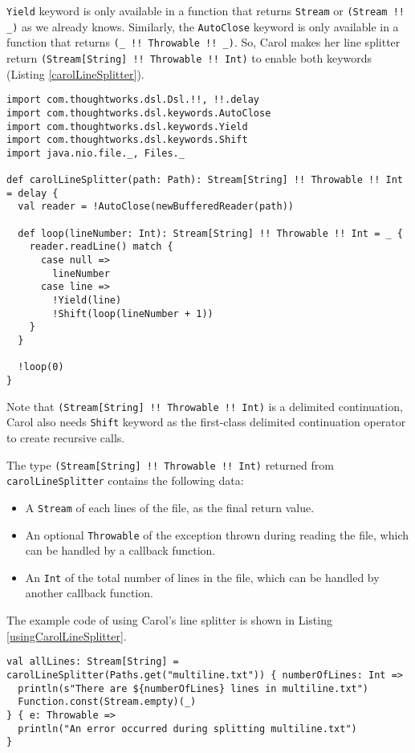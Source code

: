 \lstinline{Yield} keyword is only available in a function that returns \lstinline{Stream} or \lstinline{(Stream !! _)} as we already knows. Similarly, the \lstinline{AutoClose} keyword is only available in a function that returns \lstinline{(_ !! Throwable !! _)}. So, Carol makes her line splitter return \lstinline{(Stream[String] !! Throwable !! Int)} to enable both keywords (Listing \ref{carolLineSplitter}).

\begin{lstlisting}[caption={Carol's line splitter},label={carolLineSplitter}]
import com.thoughtworks.dsl.Dsl.!!, !!.delay
import com.thoughtworks.dsl.keywords.AutoClose
import com.thoughtworks.dsl.keywords.Yield
import com.thoughtworks.dsl.keywords.Shift
import java.nio.file._, Files._

def carolLineSplitter(path: Path): Stream[String] !! Throwable !! Int = delay {
  val reader = !AutoClose(newBufferedReader(path))

  def loop(lineNumber: Int): Stream[String] !! Throwable !! Int = _ {
    reader.readLine() match {
      case null =>
        lineNumber
      case line =>
        !Yield(line)
        !Shift(loop(lineNumber + 1))
    }
  }

  !loop(0)
}
\end{lstlisting}

Note that \lstinline{(Stream[String] !! Throwable !! Int)} is a delimited continuation, Carol also needs \lstinline{Shift} keyword as the first-class delimited continuation operator\cite{danvy1990abstracting,asai2009typing} to create recursive calls.

The type \lstinline{(Stream[String] !! Throwable !! Int)} returned from \lstinline{carolLineSplitter} contains the following data:

\begin{itemize}
  \item A \lstinline{Stream} of each lines of the file, as the final return value.
  \item An optional \lstinline{Throwable} of the exception thrown during reading the file, which can be handled by a callback function.
  \item An \lstinline{Int} of the total number of lines in the file, which can be handled by another callback function.
\end{itemize}

The example code of using Carol's line splitter is shown in Listing \ref{usingCarolLineSplitter}.

\begin{lstlisting}[caption={Using Carol's line splitter},label={usingCarolLineSplitter}]
val allLines: Stream[String] = carolLineSplitter(Paths.get("multiline.txt")) { numberOfLines: Int =>
  println(s"There are ${numberOfLines} lines in multiline.txt")
  Function.const(Stream.empty)(_)
} { e: Throwable =>
  println("An error occurred during splitting multiline.txt")
}
\end{lstlisting}


